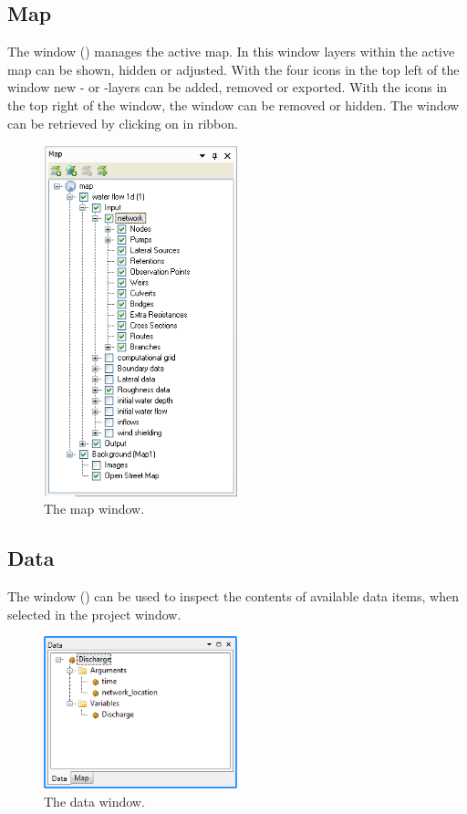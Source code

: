 \subsection{Map}
\label{subsec:Map}
The  window () manages the active map. In this window layers within the active map can be shown, hidden or adjusted.
%
With the four icons in the top left of the window new - or -layers can be added, removed or exported. With the icons in the top right of the window, the window can be removed or hidden. The window can be retrieved by clicking on  in  ribbon.
%
\begin{figure} [H]
	\centering
		\includegraphics[width=0.5\textwidth]{figures/chapter_overview/view_map_window.png}
	\caption{The map window.}
	\label{fig:fig2.4}
\end{figure}

\subsection{Data}
\label{subsec:data}
The  window () can be used to inspect the contents of available data items, when selected in the project window.
%
\begin{figure} [H]
	\centering
		\includegraphics[width=0.5\textwidth]{figures/chapter_overview/view_data_window.png}
	\caption{The data window.}
	\label{fig:datawindow}
\end{figure}

